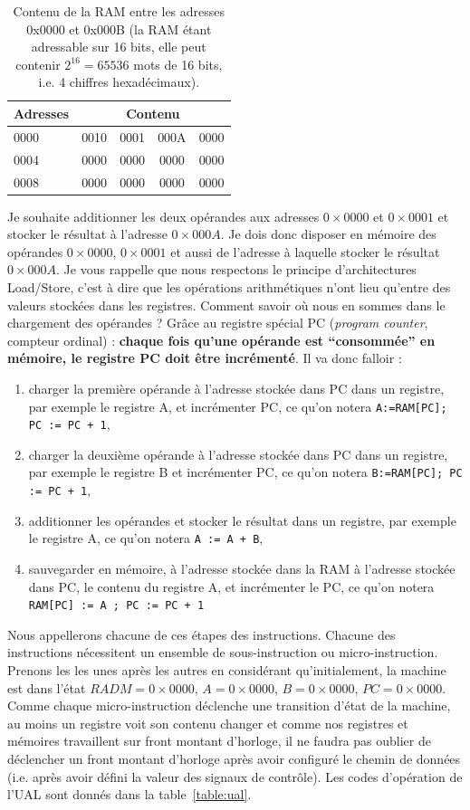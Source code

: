 \begin{table}[htbp]
\centering\begin{tabular}{l|cccc}
Adresses & \multicolumn{4}{c}{Contenu}\\
\hline
0000 & 0010 & 0001 & 000A & 0000\\
0004 & 0000 & 0000 & 0000 & 0000\\
0008 & 0000 & 0000 & 0000 & 0000
\end{tabular}
\caption{\label{fig:ram_content1} Contenu de la RAM entre les adresses 0x0000 et 0x000B (la RAM étant adressable sur 16 bits, elle peut contenir $2^{16} = 65536$ mots de 16 bits, i.e. 4 chiffres hexadécimaux). }
\end{table}

Je souhaite additionner les deux opérandes aux adresses $0\times0000$ et $0\times0001$ et stocker le résultat à l'adresse $0\times000A$. Je dois donc disposer en mémoire des opérandes $0\times0000$, $0\times0001$ et aussi de l'adresse à laquelle stocker le résultat $0\times000A$. Je vous rappelle que nous respectons le principe d'architectures Load/Store, c'est à dire que les opérations arithmétiques n'ont lieu qu'entre des valeurs stockées dans les registres. Comment savoir o{\`u} nous en sommes dans le chargement des opérandes ? Grâce au registre spécial PC (\emph{program counter}, compteur ordinal) : \textbf{chaque fois qu'une opérande est ``consommée'' en mémoire, le registre PC doit être incrémenté}. Il va donc falloir :
\begin{enumerate}
\item charger la première opérande à l'adresse stockée dans PC dans un registre, par exemple le registre A, et incrémenter PC, ce qu'on notera \texttt{A:=RAM[PC]; PC := PC + 1},
\item charger la deuxième opérande à l'adresse stockée dans PC dans un registre, par exemple le registre B et incrémenter PC, ce qu'on notera \texttt{B:=RAM[PC]; PC := PC + 1},
\item additionner les opérandes et stocker le résultat dans un registre, par exemple le registre A, ce qu'on notera \texttt{A := A + B},
\item sauvegarder en mémoire, à l'adresse stockée dans la RAM à l'adresse stockée dans PC, le contenu du registre A, et incrémenter le PC, ce qu'on notera \texttt{RAM[PC] := A ; PC := PC + 1}
\end{enumerate}

Nous appellerons chacune de ces étapes des instructions. Chacune des instructions nécessitent un ensemble de sous-instruction ou micro-instruction. Prenons les les unes après les autres en considérant qu'initialement, la machine est dans l'état $RADM=0\times0000$, $A=0\times0000$, $B=0\times0000$, $PC=0\times0000$. Comme chaque micro-instruction déclenche une transition d'état de la machine, au moins un registre voit son contenu changer et comme nos registres et mémoires travaillent sur front montant d'horloge, il ne faudra pas oublier de déclencher un front montant d'horloge après avoir configuré le chemin de données (i.e. après avoir défini la valeur des signaux de contrôle). Les codes d'opération de l'UAL sont donnés dans la table~\ref{table:ual}.


